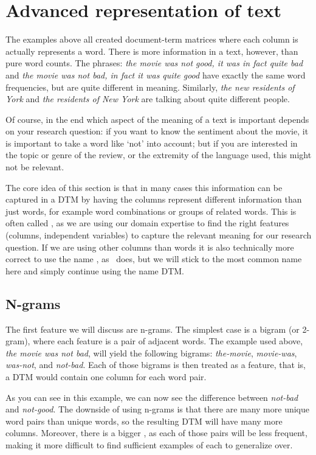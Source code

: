 \section{Advanced representation of text}
\label{ngram}

The examples above all created document-term matrices where each column is actually represents a word.
There is more information in a text, however, than pure word counts.
The phrases: \emph{the movie was not good, it was in fact quite bad} and \emph{the movie was not bad, in fact it was quite good}
have exactly the same word frequencies, but are quite different in meaning.
Similarly, \emph{the new residents of York} and \emph{the residents of New York} are talking about quite different people. 

Of course, in the end which aspect of the meaning of a text is important depends on your research question:
if you want to know the sentiment about the movie, it is important to take a word like `not' into account;
but if you are interested in the topic or genre of the review, or the extremity of the language used, this might not be relevant.

The core idea of this section is that in many cases this information can be captured in a DTM by having the columns represent different information than just words, for example word combinations or groups of related words.
This is often called , as we are using our domain expertise to find the right features (columns, independent variables) to capture the relevant meaning for our research question.
If we are using other columns than words it is also technically more correct to use the name , as \quanteda\ does, but we will stick to the most common name here and simply continue using the name DTM.

\subsection{N-grams}

The first feature we will discuss are n-grams.
The simplest case is a bigram (or 2-gram), where each feature is a pair of adjacent words.
The example used above, \emph{the movie was not bad}, will yield the following bigrams: \emph{the-movie}, \emph{movie-was}, \emph{was-not}, and \emph{not-bad}.
Each of those bigrams is then treated as a feature, that is, a DTM would contain one column for each word pair.

As you can see in this example, we can now see the difference between \emph{not-bad} and \emph{not-good}.
The downside of using n-grams is that there are many more unique word pairs than unique words,
so the resulting DTM will have many more columns.
Moreover, there is a bigger , as each of those pairs will be less frequent,
making it more difficult to find sufficient examples of each to generalize over.

